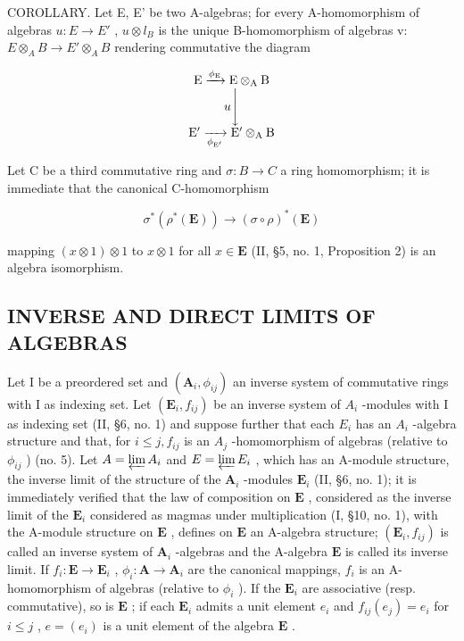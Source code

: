 COROLLARY. Let E, E' be two A-algebras; for every A-homomorphism of algebras \(u: E \to E'\) , \(u \otimes l_{B}\) is the unique B-homomorphism of algebras v: \(E \otimes_{A} B \to E' \otimes_{A} B\) rendering commutative the diagram

\[
\begin{array}{c} \mathrm{E} \xrightarrow {\phi_ {\mathrm{E}}} \mathrm{E} \otimes_ {\mathrm{A}} \mathrm{B} \\ u \Biggl \downarrow \\ \mathrm{E} ^ {\prime} \xrightarrow [ \phi_ {\mathrm{E} ^ {\prime}} ]{} \mathrm{E} ^ {\prime} \otimes_ {\mathrm{A}} \mathrm{B} \end{array}
\]

Let C be a third commutative ring and \(\sigma: B \to C\) a ring homomorphism; it is immediate that the canonical C-homomorphism

\[
\sigma^ {*} (\rho^ {*} (\mathbf {E})) \rightarrow (\sigma \circ \rho) ^ {*} (\mathbf {E})
\]

mapping \((x\otimes 1)\otimes 1\) to \(x\otimes 1\) for all \(x\in \mathbf{E}\) (II, §5, no. 1, Proposition 2) is an algebra isomorphism.

\subsection{INVERSE AND DIRECT LIMITS OF ALGEBRAS}

Let I be a preordered set and \((\mathbf{A}_{i},\phi_{ij})\) an inverse system of commutative rings with I as indexing set. Let \((\mathbf{E}_{i},f_{ij})\) be an inverse system of \(A_{i}\) -modules with I as indexing set (II, §6, no. 1) and suppose further that each \(E_{i}\) has an \(A_{i}\) -algebra structure and that, for \(i\leqslant j,f_{ij}\) is an \(A_{j}\) -homomorphism of algebras (relative to \(\phi_{ij}\) ) (no. 5). Let \(A=\varprojlim A_{i}\) and \(E=\varprojlim E_{i}\) , which has an A-module structure, the inverse limit of the structure of the \(\mathbf{A}_i\) -modules \(\mathbf{E}_i\) (II, §6, no. 1); it is immediately verified that the law of composition on \(\mathbf{E}\) , considered as the inverse limit of the \(\mathbf{E}_i\) considered as magmas under multiplication (I, §10, no. 1), with the A-module structure on \(\mathbf{E}\) , defines on \(\mathbf{E}\) an A-algebra structure; \((\mathbf{E}_i, f_{ij})\) is called an inverse system of \(\mathbf{A}_i\) -algebras and the A-algebra \(\mathbf{E}\) is called its inverse limit. If \(f_i: \mathbf{E} \to \mathbf{E}_i\) , \(\phi_i: \mathbf{A} \to \mathbf{A}_i\) are the canonical mappings, \(f_i\) is an A-homomorphism of algebras (relative to \(\phi_i\) ). If the \(\mathbf{E}_i\) are associative (resp. commutative), so is \(\mathbf{E}\) ; if each \(\mathbf{E}_i\) admits a unit element \(e_i\) and \(f_{ij}(e_j) = e_i\) for \(i \leqslant j\) , \(e = (e_i)\) is a unit element of the algebra \(\mathbf{E}\) .

